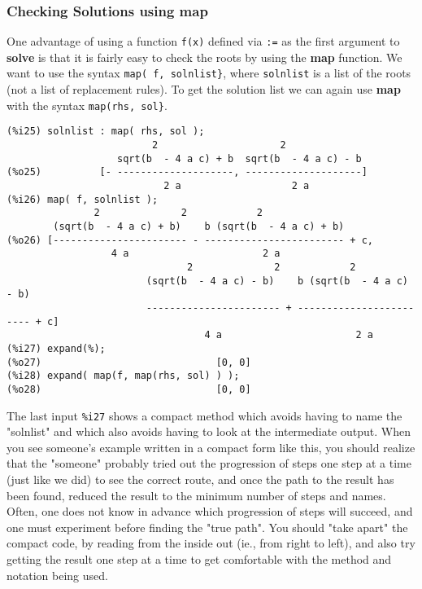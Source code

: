 \documentclass[12pt]{article}
\begin{document}
 
 \subsubsection{Checking Solutions using map}
One advantage of using a function \verb|f(x)| defined via \verb|:=| as the first
  argument to \textbf{solve} is that it is fairly easy to check the roots
  by using the \textbf{map} function.
We want to use the syntax \verb|map( f, solnlist}|, where \verb|solnlist| is
  a list of the roots (not a list of replacement rules).
To get the solution list we can again use \textbf{map} with the syntax
  \verb|map(rhs, sol}|.
\small
\begin{verbatim}
(%i25) solnlist : map( rhs, sol );
                         2                     2
                   sqrt(b  - 4 a c) + b  sqrt(b  - 4 a c) - b
(%o25)          [- --------------------, --------------------]
                           2 a                   2 a
(%i26) map( f, solnlist );
               2              2            2
        (sqrt(b  - 4 a c) + b)    b (sqrt(b  - 4 a c) + b)
(%o26) [----------------------- - ------------------------ + c, 
                  4 a                       2 a
                               2              2            2
                        (sqrt(b  - 4 a c) - b)    b (sqrt(b  - 4 a c) - b)
                        ----------------------- + ------------------------ + c]
                                  4 a                       2 a
(%i27) expand(%);
(%o27)                              [0, 0]
(%i28) expand( map(f, map(rhs, sol) ) );
(%o28)                              [0, 0]
\end{verbatim}
\normalsize
  The last input \verb|%i27| shows a compact method which avoids having to name
   the "solnlist" and which also avoids having to look at the intermediate output.
When you see someone's example written in a compact form like this,
  you should realize that the "someone" probably tried out the progression of
  steps one step at a time (just like we did) to see the correct route, and once
  the path to the result has been found, reduced the result to the minimum
  number of steps and names.
Often, one does not know in advance which progression of steps will succeed,
  and one must experiment before finding the "true path".
You should "take apart" the compact code, by reading from the inside out (ie., from 
  right to left), and also try getting the result one step at a time to get
  comfortable with the method and notation being used.
\end{document}
